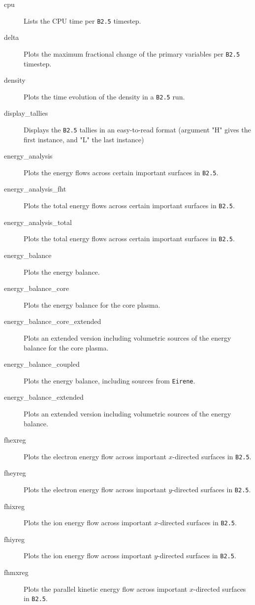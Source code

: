 \documentclass[a4paper,10pt]{report}
\begin{document}
\begin{itemize}
\begin{description}
  \item[cpu] Lists the CPU time per {\tt B2.5} timestep.
  \item[delta] Plots the maximum fractional change of the primary variables per {\tt B2.5} timestep.
  \item[density] Plots the time evolution of the density in a {\tt B2.5} run.
  \item[display\_tallies] Displays the {\tt B2.5} tallies in an easy-to-read format (argument "H" gives the first instance, and "L" the last instance)
  \item[energy\_analysis] Plots the energy flows across certain important surfaces in {\tt B2.5}.
  \item[energy\_analysis\_fht] Plots the total energy flows across certain important surfaces in {\tt B2.5}.
  \item[energy\_analysis\_total] Plots the total energy flows across certain important surfaces in {\tt B2.5}.
  \item[energy\_balance] Plots the energy balance.
  \item[energy\_balance\_core] Plots the energy balance for the core plasma.
  \item[energy\_balance\_core\_extended] Plots an extended version including volumetric sources of the energy balance for the core plasma.
  \item[energy\_balance\_coupled] Plots the energy balance, including sources from {\tt Eirene}.
  \item[energy\_balance\_extended] Plots an extended version including volumetric sources of the energy balance.
  \item[fhexreg] Plots the electron energy flow across important $x$-directed surfaces in {\tt B2.5}.
  \item[fheyreg] Plots the electron energy flow across important $y$-directed surfaces in {\tt B2.5}.
  \item[fhixreg] Plots the ion energy flow across important $x$-directed surfaces in {\tt B2.5}.
  \item[fhiyreg] Plots the ion energy flow across important $y$-directed surfaces in {\tt B2.5}.
  \item[fhmxreg] Plots the parallel kinetic energy flow across important $x$-directed surfaces in {\tt B2.5}.

\end{description}
\end{itemize}
\end{document}
